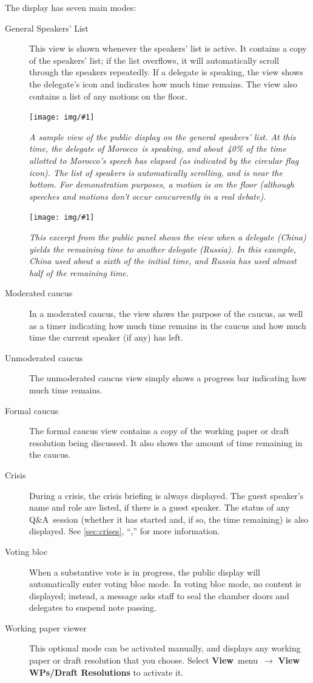 \documentclass{article}
\newcommand{\navstep}[2]{\navitem{#1}~{#2}~$\rightarrow$}
\newcommand{\navitem}[1]{\textbf{#1}}
\newcommand{\See}[1]{\seewith{See}{#1}}
\newcommand{\seewith}[2]{#1 \cref{#2}, ``\nameref{#2},'' \vpageref{#2}}
\newcommand{\encouragebreak}[1]{\vfil\penalty-#1\vfilneg}
\newcommand{\img}[2]{%
  \begin{center}
    \vspace{6pt}
    \encouragebreak{100}
    \centerline{\texttt{[image: img/\#1]}}
    {\slshape #2}
    \encouragebreak{300}
  \end{center}
}
\begin{document}
The display has seven main modes:
\begin{description}
  \item[General Speakers' List]
    This view is shown whenever the speakers' list is active.
    It contains a copy of the speakers' list; if the list overflows, it will automatically scroll through the speakers repeatedly.
    If a delegate is speaking, the view shows the delegate's icon and indicates how much time remains.
    The view also contains a list of any motions on the floor.
    \img{public_panel_gsl}{%
      A sample view of the public display on the general speakers' list.
      At this time, the delegate of Morocco~is speaking, and about~40\% of the time allotted to Morocco's speech has elapsed (as indicated by the circular flag icon).
      The list of speakers is automatically scrolling, and is near the bottom.
      For demonstration purposes, a motion is on the floor (although speeches and motions don't occur concurrently in a real debate).
    }
    \img{public_panel_yield_to_delegate}{%
      This excerpt from the public panel shows the view when a delegate (China) yields the remaining time to another delegate (Russia).
      In this example, China used about a sixth of the initial time, and Russia has used almost half of the remaining time.
    }
  \item[Moderated caucus]
    In a moderated caucus, the view shows the purpose of the caucus, as well as a timer indicating how much time remains in the caucus and how much time the current speaker (if any) has left.
  \item[Unmoderated caucus]
    The unmoderated caucus view simply shows a progress bar indicating how much time remains.
  \item[Formal caucus]
    The formal caucus view contains a copy of the working paper or draft resolution being discussed.
    It also shows the amount of time remaining in the caucus.
  \item[Crisis]
    During a crisis, the crisis briefing is always displayed.
    The guest speaker's name and role are listed, if there is a guest speaker.
    The status of any Q\&A~session (whether it has started and, if so, the time remaining) is also displayed.
    \See{sec:crises} for more information.
  \item[Voting bloc]
    When a substantive vote is in progress, the public display will automatically enter voting bloc mode.
    In voting bloc mode, no content is displayed; instead, a message asks staff to seal the chamber doors and delegates to suspend note passing.
  \item[Working paper viewer]
    This optional mode can be activated manually, and displays any working paper or draft resolution that you choose.
    Select \navstep{View}{menu} \navitem{View WPs/Draft Resolutions} to activate it.
\end{description}
\end{document}
